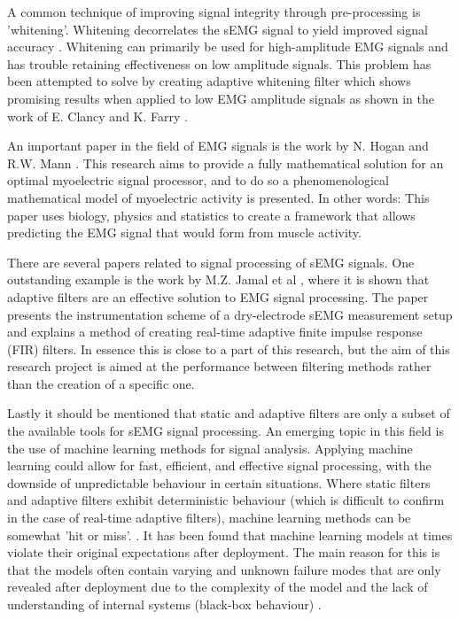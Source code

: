A common technique of improving signal integrity through pre-processing is 'whitening'. Whitening decorrelates the sEMG signal to yield improved signal accuracy \cite{emg_whitening}. 
Whitening can primarily be used for high-amplitude EMG signals and has trouble retaining effectiveness on low amplitude signals. This problem has been attempted to solve by creating adaptive whitening filter which shows promising results when applied to low EMG amplitude signals as shown in the work of E. Clancy and K. Farry \cite{adaptive_whitening}. 


An important paper in the field of EMG signals is the work by N. Hogan and R.W. Mann \cite{optimal_myoprocessor}. This research aims to provide a fully mathematical solution for an optimal myoelectric signal processor, and to do so a phenomenological mathematical model of myoelectric activity is presented. In other words: This paper uses biology, physics and statistics to create a framework that allows predicting the EMG signal that would form from muscle activity.

There are several papers related to signal processing of sEMG signals.
One outstanding example is the work by M.Z. Jamal et al  \cite{adaptive_filter_dry_electrode}, where it is shown that adaptive filters are an effective solution to EMG signal processing. The paper presents the instrumentation scheme of a dry-electrode sEMG measurement setup and explains a method of creating real-time adaptive finite impulse response (FIR) filters. In essence this is close to a part of this research, but the aim of this research project is aimed at  the performance between filtering methods rather than the creation of a specific one.

Lastly it should be mentioned that static and adaptive filters are only a subset of the available tools for sEMG signal processing. An emerging topic in this field is the use of machine learning methods for signal analysis. Applying machine learning could allow for fast, efficient, and effective signal processing, with the downside of unpredictable behaviour in certain situations. Where static filters and adaptive filters exhibit deterministic behaviour (which is difficult to confirm in the case of real-time adaptive filters), machine learning methods can be somewhat 'hit or miss'. \cite{ml_semg_processing_1,ml_semg_processing_2}. It has been found that machine learning models at times violate their original expectations after deployment. The main reason for this is that the models often contain varying and unknown failure modes that are only revealed after deployment due to the complexity of the model and the lack of understanding of internal systems (black-box behaviour) \cite{microsoft_machine_learning_reliable}.

